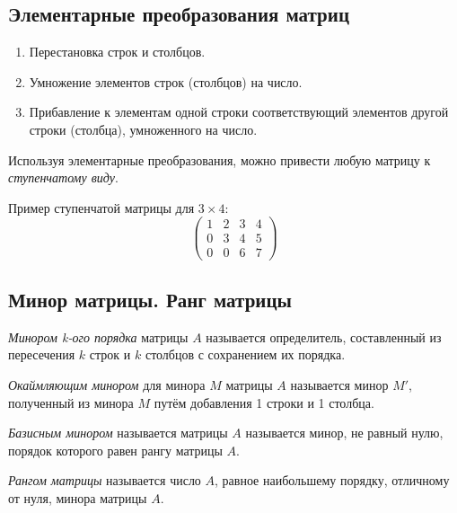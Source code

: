 \subsection{Элементарные преобразования матриц}

\begin{enumerate}
  \item Перестановка строк и столбцов.
  \item Умножение элементов строк (столбцов) на число.
  \item Прибавление к элементам одной строки соответствующий элементов другой строки (столбца), умноженного на число.
\end{enumerate}

Используя элементарные преобразования, можно привести любую матрицу к \textit{ступенчатому виду}.
\begin{eg}
  Пример ступенчатой матрицы для $3 \times 4$:
  \[
  \begin{pmatrix}
    1 & 2 & 3 & 4 \\
    0 & 3 & 4 & 5 \\
    0 & 0 & 6 & 7
  \end{pmatrix}
  \] 
\end{eg}

\subsection{Минор матрицы. Ранг матрицы}

\begin{definition}
  \textit{Минором k-ого порядка} матрицы $A$ называется определитель, составленный из пересечения $k$ строк и $k$ столбцов с сохранением их порядка.
\end{definition}

\begin{definition}
  \textit{Окаймляющим минором} для минора $M$ матрицы $A$ называется минор $M'$, полученный из минора $M$ путём добавления 1 строки и 1 столбца.
\end{definition}

\begin{definition}
  \textit{Базисным минором} называется матрицы $A$ называется минор, не равный нулю, порядок которого равен рангу матрицы $A$.
\end{definition}

\begin{definition}
  \textit{Рангом матрицы} называется число $A$, равное наибольшему порядку, отличному от нуля, минора матрицы $A$.
\end{definition}

